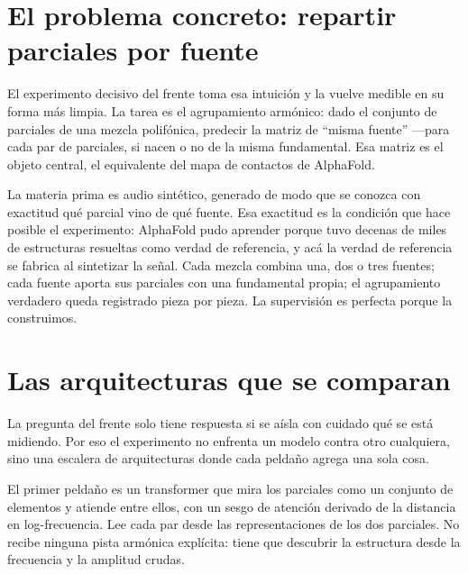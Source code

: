\documentclass[11pt]{article}
\begin{document}
\section{El problema concreto: repartir parciales por fuente}

El experimento decisivo del frente toma esa intuición y la vuelve medible en su forma más limpia. La tarea es el agrupamiento armónico: dado el conjunto de parciales de una mezcla polifónica, predecir la matriz de ``misma fuente'' —para cada par de parciales, si nacen o no de la misma fundamental. Esa matriz es el objeto central, el equivalente del mapa de contactos de AlphaFold.

La materia prima es audio sintético, generado de modo que se conozca con exactitud qué parcial vino de qué fuente. Esa exactitud es la condición que hace posible el experimento: AlphaFold pudo aprender porque tuvo decenas de miles de estructuras resueltas como verdad de referencia, y acá la verdad de referencia se fabrica al sintetizar la señal. Cada mezcla combina una, dos o tres fuentes; cada fuente aporta sus parciales con una fundamental propia; el agrupamiento verdadero queda registrado pieza por pieza. La supervisión es perfecta porque la construimos.

\section{Las arquitecturas que se comparan}

La pregunta del frente solo tiene respuesta si se aísla con cuidado qué se está midiendo. Por eso el experimento no enfrenta un modelo contra otro cualquiera, sino una escalera de arquitecturas donde cada peldaño agrega una sola cosa.

El primer peldaño es un transformer que mira los parciales como un conjunto de elementos y atiende entre ellos, con un sesgo de atención derivado de la distancia en log-frecuencia. Lee cada par desde las representaciones de los dos parciales. No recibe ninguna pista armónica explícita: tiene que descubrir la estructura desde la frecuencia y la amplitud crudas.

\begin{figure}[H]
\centering
{}
\end{figure}
\end{document}
